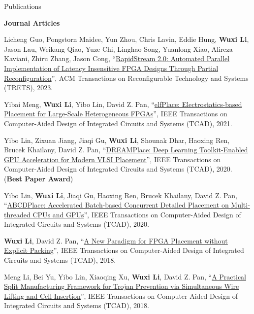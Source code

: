 \begin{rSection}{Publications}

\textbf{Journal Articles}
\begin{description}[font=\normalfont]
\item[{[J9]}]{
    Licheng Guo, Pongstorn Maidee, Yun Zhou, Chris Lavin, Eddie Hung, \textbf{Wuxi Li}, Jason Lau, Weikang Qiao, Yuze Chi, Linghao Song, Yuanlong Xiao, Alireza Kaviani, Zhiru Zhang, Jason Cong,
    ``\href{https://dl.acm.org/doi/abs/10.1145/3593025}{RapidStream 2.0: Automated Parallel Implementation of Latency Insensitive FPGA Designs Through Partial Reconfiguration}'',
    ACM Transactions on Reconfigurable Technology and Systems (TRETS), 2023.
}

\item[{[J8]}]{
    Yibai Meng, \textbf{Wuxi Li}, Yibo Lin, David Z. Pan,
    ``\href{https://ieeexplore.ieee.org/abstract/document/9330804}{elfPlace: Electrostatics-based Placement for Large-Scale Heterogeneous FPGAs}'',
    IEEE Transactions on Computer-Aided Design of Integrated Circuits and Systems (TCAD), 2021.
}

\item[{[J7]}]{
    Yibo Lin, Zixuan Jiang, Jiaqi Gu, \textbf{Wuxi Li}, Shounak Dhar, Haoxing Ren, Brucek Khailany, David Z. Pan,
    ``\href{https://ieeexplore.ieee.org/abstract/document/9122053}{DREAMPlace: Deep Learning Toolkit-Enabled GPU Acceleration for Modern VLSI Placement}'',
    IEEE Transactions on Computer-Aided Design of Integrated Circuits and Systems (TCAD), 2020.
    (\textbf{Best Paper Award})
}

\item[{[J6]}]{
    Yibo Lin, \textbf{Wuxi Li}, Jiaqi Gu, Haoxing Ren, Brucek Khailany, David Z. Pan,
    ``\href{https://ieeexplore.ieee.org/document/8982049}{ABCDPlace: Accelerated Batch-based Concurrent Detailed Placement on Multi-threaded CPUs and GPUs}'',
    IEEE Transactions on Computer-Aided Design of Integrated Circuits and Systems (TCAD), 2020.
}

\item[{[J5]}]{
    \textbf{Wuxi Li}, David Z. Pan,
    ``\href{https://ieeexplore.ieee.org/document/8500228/}{A New Paradigm for FPGA Placement without Explicit Packing}'',
    IEEE Transactions on Computer-Aided Design of Integrated Circuits and Systems (TCAD), 2018.
}

\item[{[J4]}]{
    Meng Li, Bei Yu, Yibo Lin, Xiaoqing Xu, \textbf{Wuxi Li}, David Z. Pan,
    ``\href{https://ieeexplore.ieee.org/document/8419279/}{A Practical Split Manufacturing Framework for Trojan Prevention via Simultaneous Wire Lifting and Cell Insertion}'',
    IEEE Transactions on Computer-Aided Design of Integrated Circuits and Systems (TCAD), 2018.
}


\end{description}
\end{rSection}
